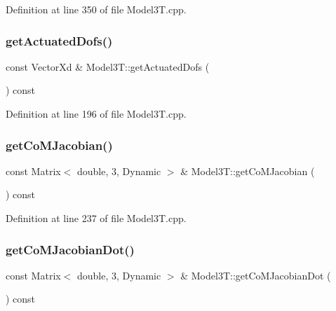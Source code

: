 Definition at line 350 of file Model3\+T.\+cpp.

\hypertarget{classModel3T_aad7041820bf886ee965b05611bdedfd0}{}\label{classModel3T_aad7041820bf886ee965b05611bdedfd0} 
\subsubsection{\texorpdfstring{get\+Actuated\+Dofs()}{getActuatedDofs()}}
{\footnotesize\ttfamily const Vector\+Xd \& Model3\+T\+::get\+Actuated\+Dofs (\begin{DoxyParamCaption}{ }\end{DoxyParamCaption}) const\hspace{0.3cm}{\ttfamily [virtual]}}



Definition at line 196 of file Model3\+T.\+cpp.

\hypertarget{classModel3T_addc6149d27f7cb5d3c8ab453e55b88e4}{}\label{classModel3T_addc6149d27f7cb5d3c8ab453e55b88e4} 
\subsubsection{\texorpdfstring{get\+Co\+M\+Jacobian()}{getCoMJacobian()}}
{\footnotesize\ttfamily const Matrix$<$ double, 3, Dynamic $>$ \& Model3\+T\+::get\+Co\+M\+Jacobian (\begin{DoxyParamCaption}{ }\end{DoxyParamCaption}) const\hspace{0.3cm}{\ttfamily [virtual]}}



Definition at line 237 of file Model3\+T.\+cpp.

\hypertarget{classModel3T_a6b63e04105ce4fa8026681ea1109702e}{}\label{classModel3T_a6b63e04105ce4fa8026681ea1109702e} 
\subsubsection{\texorpdfstring{get\+Co\+M\+Jacobian\+Dot()}{getCoMJacobianDot()}}
{\footnotesize\ttfamily const Matrix$<$ double, 3, Dynamic $>$ \& Model3\+T\+::get\+Co\+M\+Jacobian\+Dot (\begin{DoxyParamCaption}{ }\end{DoxyParamCaption}) const\hspace{0.3cm}{\ttfamily [virtual]}}



